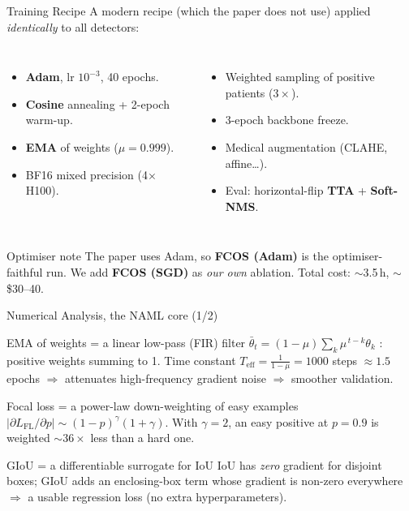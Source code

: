 \documentclass[aspectratio=169,11pt]{beamer}
\newcommand{\hl}[1]{\textcolor{polimi}{\textbf{#1}}}
\begin{document}
\begin{frame}{Training Recipe}
  \small
  A modern recipe (which the paper does not use) applied \emph{identically} to all detectors:
  \begin{columns}[T]
      \begin{itemize}\small
        \item \hl{Adam}, lr $10^{-3}$, 40 epochs.
        \item \hl{Cosine} annealing + 2-epoch warm-up.
        \item \hl{EMA} of weights ($\mu=0.999$).
        \item BF16 mixed precision (4$\times$H100).
      \end{itemize}
      \begin{itemize}\small
        \item Weighted sampling of positive patients ($3\times$).
        \item 3-epoch backbone freeze.
        \item Medical augmentation (CLAHE, affine\dots).
        \item Eval: horizontal-flip \hl{TTA} + \hl{Soft-NMS}.
      \end{itemize}
  \end{columns}
  \vspace{0.5em}
  \begin{block}{\small Optimiser note}
    \small The paper uses Adam, so \textbf{FCOS (Adam)} is the optimiser-faithful run.
    We add \textbf{FCOS (SGD)} as \emph{our own} ablation. Total cost: $\sim$3.5\,h, $\sim$\$30--40.
  \end{block}
\end{frame}

\begin{frame}{Numerical Analysis, the NAML core (1/2)}
  \small
  \begin{block}{\small EMA of weights = a linear low-pass (FIR) filter}
    \small
    $\bar\theta_t=(1-\mu)\sum_k \mu^{\,t-k}\theta_k$ : positive weights summing to 1.
    Time constant $T_{\mathrm{eff}}=\tfrac{1}{1-\mu}=1000$ steps $\approx 1.5$ epochs
    $\Rightarrow$ attenuates high-frequency gradient noise $\Rightarrow$ smoother validation.
  \end{block}
  \begin{block}{\small Focal loss = a power-law down-weighting of easy examples}
    \small
    $\big|\partial L_{\mathrm{FL}}/\partial p\big| \sim (1-p)^{\gamma}(1+\gamma)$.
    With $\gamma=2$, an easy positive at $p=0.9$ is weighted $\sim\!36\times$ less than a hard one.
  \end{block}
  \begin{block}{\small GIoU = a differentiable surrogate for IoU}
    \small
    IoU has \emph{zero} gradient for disjoint boxes; GIoU adds an enclosing-box term whose
    gradient is non-zero everywhere $\Rightarrow$ a usable regression loss (no extra hyperparameters).
  \end{block}
\end{frame}
\end{document}
